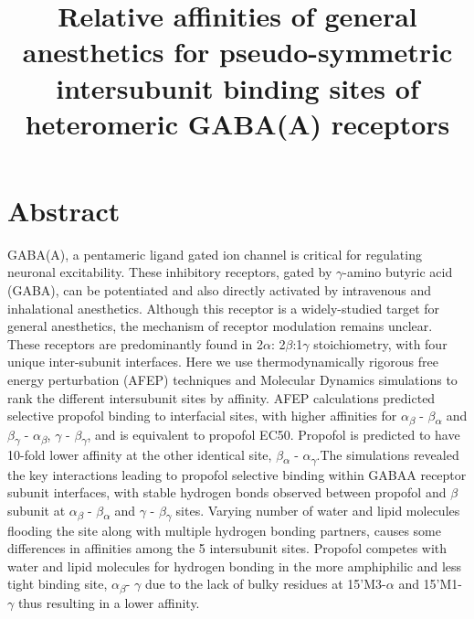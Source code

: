 \documentclass{biophys}
\begin{document}
\newcommand{\GABAA}{GABA\textsubscript{A}R\xspace}
\newcommand{\gb}{$\gamma$ - $\beta$\textsubscript{$\gamma$}\xspace}
\newcommand{\gba}{$\beta$\textsubscript{$\gamma$} - $\alpha$\textsubscript{$\beta$}\xspace}
\newcommand{\ab}{$\alpha$\textsubscript{$\beta$} - $\beta$\textsubscript{$\alpha$}\xspace}
\newcommand{\bag}{$\beta$\textsubscript{$\alpha$} - $\alpha$\textsubscript{$\gamma$}\xspace}
\newcommand{\ag}{{$\alpha$\textsubscript{$\gamma$} - $\gamma$}\xspace}
\newcommand{\Ps}{\textit{Propofol}-$\alpha$\textsubscript{1}$\beta$\textsubscript{3}$\gamma$\textsubscript{2}\xspace}
\newcommand{\Ss}{\textit{Sevoflurane}-$\alpha$\textsubscript{1}$\beta$\textsubscript{3}$\gamma$\textsubscript{2}\xspace}
\setcounter{page}{1} %

\title{Relative affinities of general anesthetics for pseudo-symmetric intersubunit
binding sites of heteromeric GABA(A) receptors}

\section{Abstract}
GABA(A), a pentameric ligand gated ion channel is critical for regulating neuronal excitability. These inhibitory receptors, gated by $\gamma$-amino butyric acid (GABA), can be potentiated and also directly activated by intravenous and inhalational anesthetics. Although this receptor is a widely-studied target for general anesthetics, the mechanism of receptor modulation remains unclear. These receptors are predominantly found in 2$\alpha$:
2$\beta$:1$\gamma$ stoichiometry, with four unique inter-subunit interfaces.  Here we use thermodynamically rigorous free energy perturbation (AFEP) techniques and Molecular Dynamics simulations to rank the different intersubunit sites by affinity. AFEP calculations predicted selective propofol binding to interfacial
sites, with higher affinities for  $\alpha$\textsubscript{$\beta$} - $\beta$\textsubscript{$\alpha$} and $\beta$\textsubscript{$\gamma$} - $\alpha$\textsubscript{$\beta$}, $\gamma$ - $\beta$\textsubscript{$\gamma$}, and is equivalent to propofol EC50. Propofol is predicted to have 10-fold lower affinity at the other identical site, $\beta$\textsubscript{$\alpha$} - $\alpha$\textsubscript{$\gamma$}.The simulations revealed the key interactions leading to propofol selective binding within GABAA receptor subunit interfaces, with stable hydrogen bonds observed between propofol and  $\beta$ subunit at  $\alpha$\textsubscript{$\beta$} - $\beta$\textsubscript{$\alpha$} and $\gamma$ - $\beta$\textsubscript{$\gamma$} sites. Varying number of water and lipid molecules flooding the site along with multiple hydrogen bonding partners, causes some differences in affinities among the 5 intersubunit sites. Propofol competes with water and lipid molecules for hydrogen bonding in the more amphiphilic and less tight binding site, $\alpha$\textsubscript{$\beta$}- $\gamma$ due to the lack of bulky residues at 15'M3-$\alpha$ and 15'M1-$\gamma$ thus resulting in a lower affinity. 
 
\end{document}
